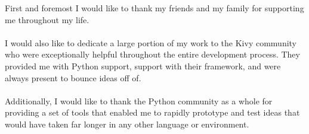 First and foremost I would like to thank my friends and my family for supporting me throughout my life.
\\
\\
I would also like to dedicate a large portion of my work to the Kivy community who were exceptionally helpful throughout the entire development process. They provided me with Python support, support with their framework, and were always present to bounce ideas off of. 
\\
\\
Additionally, I would like to thank the Python community as a whole for providing a set of tools that enabled me to rapidly prototype and test ideas that would have taken far longer in any other language or environment.
